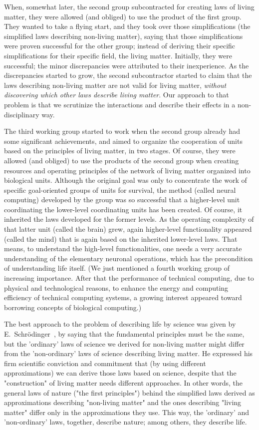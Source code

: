 When, somewhat later, the second group subcontracted for creating laws of living matter, 
they were allowed (and obliged) to use the product of the first group. They wanted to take a flying start,
and they took over those simplifications (the simplified laws describing non-living matter),
saying that those simplifications were proven successful for the other group; instead of deriving their specific simplifications for their specific field,
the living matter. Initially, they were successful; the minor discrepancies were attributed to their inexperience.
As the discrepancies started to grow, the second subcontractor started to claim that the laws describing non-living matter are not valid for living matter,
\textit{without discovering which other laws describe living matter}. Our approach to that problem is that we scrutinize 
the interactions and describe their effects in a non-disciplinary way.

The third working group started to work when the second group 
already had some significant achievements, and aimed to organize the cooperation of units
based on the principles of living matter, in two stages. Of course, 
they were allowed (and obliged) to use the products of the second group
when creating resources and operating principles of the network
of living matter organized into biological units. 
Although the original goal was only to concentrate the work of specific 
goal-oriented groups of units for survival, the method (called neural computing) developed by the group was so successful that a higher-level unit coordinating the lower-level coordinating units has been created.
Of course, it inherited the laws developed for the former levels.
As the operating complexity of that latter unit (called the brain) grew, 
again higher-level functionality appeared (called the mind) that is again based on the inherited lower-level laws. That means, to understand the high-level functionalities, one needs a very accurate understanding 
of the elementary neuronal operations, which has the precondition of
understanding life itself. (We just mentioned a fourth working group of increasing importance.
After that the performance of technical computing, due to physical and technological reasons, to enhance the energy and computing efficiency of technical computing systems, a growing interest appeared toward borrowing concepts of biological computing.)


The best approach to the problem of describing life by science was given by E.~Schrödinger~\cite{Schrodinger:1992}, by saying that the fundamental
principles must be the same, but the 'ordinary' laws of science we derived for non-living matter might differ from the 'non-ordinary' laws of science describing living matter.
He expressed his firm scientific conviction and commitment that (by using different approximations) we can derive those laws based on science, despite
that the "construction" of living matter needs different approaches.
In other words, the general laws of nature ("the first principles") behind the simplified laws
derived as approximations describing "non-living matter" 
and the ones describing "living matter" differ only in the
approximations they use. This way, the 'ordinary' and 'non-ordinary' laws,
together, describe nature; among others, they describe life.


